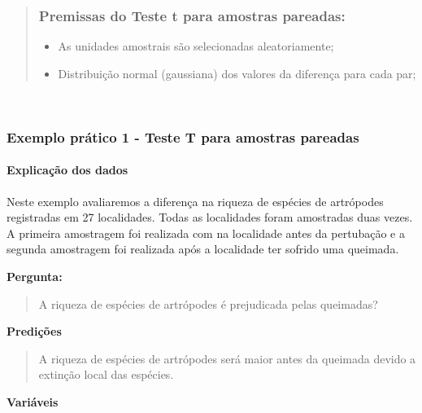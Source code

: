 \documentclass[
]{book}
\providecommand{\tightlist}{%
  \setlength{\itemsep}{0pt}\setlength{\parskip}{0pt}}
\begin{document}
\begin{quote}
\hypertarget{premissas-do-teste-t-para-amostras-pareadas}{%
\subsubsection{Premissas do Teste t para amostras pareadas:}\label{premissas-do-teste-t-para-amostras-pareadas}}

\begin{itemize}
\tightlist
\item
  As unidades amostrais são selecionadas aleatoriamente;
\item
  Distribuição normal (gaussiana) dos valores da diferença para cada par;
\end{itemize}
\end{quote}

~

\hypertarget{exemplo-pruxe1tico-1---teste-t-para-amostras-pareadas}{%
\subsubsection{Exemplo prático 1 - Teste T para amostras pareadas}\label{exemplo-pruxe1tico-1---teste-t-para-amostras-pareadas}}

\hypertarget{explicauxe7uxe3o-dos-dados-2}{%
\paragraph{Explicação dos dados}\label{explicauxe7uxe3o-dos-dados-2}}

Neste exemplo avaliaremos a diferença na riqueza de espécies de artrópodes registradas em 27 localidades. Todas as localidades foram amostradas duas vezes. A primeira amostragem foi realizada com na localidade antes da pertubação e a segunda amostragem foi realizada após a localidade ter sofrido uma queimada.

\textbf{Pergunta:}

\begin{quote}
A riqueza de espécies de artrópodes é prejudicada pelas queimadas?
\end{quote}

\textbf{Predições}

\begin{quote}
A riqueza de espécies de artrópodes será maior antes da queimada devido a extinção local das espécies.
\end{quote}

\textbf{Variáveis}
\end{document}
